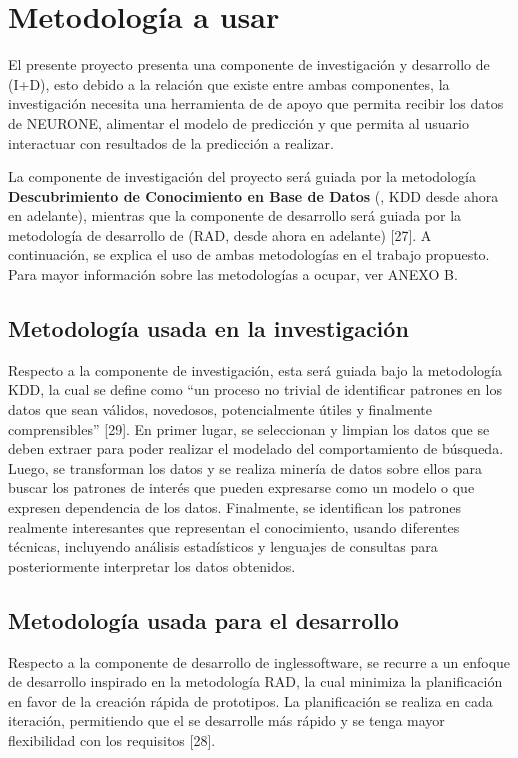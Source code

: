 \section{Metodología a usar}
\label{sec:metodologia}
El presente proyecto presenta una componente de investigación y desarrollo de  (I+D), esto debido a la relación que existe entre ambas componentes, la investigación necesita una herramienta de  de apoyo que permita recibir los datos de NEURONE, alimentar el modelo de predicción y que permita al usuario interactuar con resultados de la predicción a realizar.

La componente de investigación del proyecto será guiada por la metodología \textbf{Descubrimiento de Conocimiento en Base de Datos} (, KDD desde ahora en adelante), mientras que la componente de desarrollo será guiada por la metodología de desarrollo de   (RAD, desde ahora en adelante) [27]. A continuación, se explica el uso de ambas metodologías en el trabajo propuesto. Para mayor información sobre las metodologías a ocupar, ver ANEXO B.

\subsection{Metodología usada en la investigación}
Respecto a la componente de investigación, esta será guiada bajo la metodología KDD, la cual se define como “un proceso no trivial de identificar patrones en los datos que sean válidos, novedosos, potencialmente útiles y finalmente comprensibles” [29]. En primer lugar, se seleccionan y limpian los datos que se deben extraer para poder realizar el modelado del comportamiento de búsqueda. Luego, se transforman los datos y se realiza minería de datos sobre ellos para buscar los patrones de interés que pueden expresarse como un modelo o que expresen dependencia de los datos. Finalmente, se identifican los patrones realmente interesantes que representan el conocimiento, usando diferentes técnicas, incluyendo análisis estadísticos y lenguajes de consultas para posteriormente interpretar los datos obtenidos.

\subsection{Metodología usada para el desarrollo}
Respecto a la componente de desarrollo de ingles{software}, se recurre a un enfoque de desarrollo inspirado en la metodología RAD, la cual minimiza la planificación en favor de la creación rápida de prototipos. La planificación se realiza en cada iteración, permitiendo que el  se desarrolle más rápido y se tenga mayor flexibilidad con los requisitos [28].